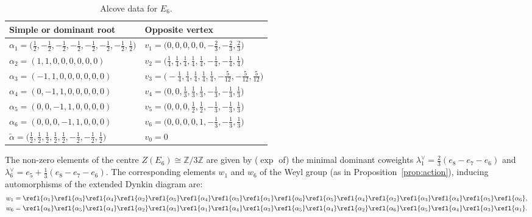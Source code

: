\documentclass[pdftex]{sigma}
\numberwithin{equation}{section}
\begin{document}
\begin{table}[h] \centering\renewcommand{\arraystretch}{1.3}
\caption{Alcove data for $E_6$.}\label{table:alcE6}
\vspace{1mm}

\begin{tabular}{ll}
\hline
Simple or dominant root & Opposite vertex
\\
\hline
$\alpha_1=\big(\frac{1}{2},-\frac{1}{2},-\frac{1}{2},-\frac{1}{2},-\frac{1}{2},-\frac{1}{2},-\frac{1}{2},\frac{1}{2}\big)$ &
$v_1=\big(0,0,0,0,0,-\frac{2}{3},-\frac{2}{3},\frac{2}{3}\big)$
\\
$\alpha_2=(1,1,0,0,0,0,0,0)$ &
$v_2=\big(\frac{1}{4},\frac{1}{4},\frac{1}{4},\frac{1}{4},\frac{1}{4},-\frac{1}{4},-\frac{1}{4},\frac{1}{4}\big)$
\\
$\alpha_3=(-1,1,0,0,0,0,0,0)$ &
$v_3=\big({-}\frac{1}{4},\frac{1}{4},\frac{1}{4},\frac{1}{4},\frac{1}{4},-\frac{5}{12},-\frac{5}{12},\frac{5}{12}\big)$
\\
$\alpha_4=(0,-1,1,0,0,0,0,0)$ & $v_4=\big(0,0,\frac{1}{3},\frac{1}{3},\frac{1}{3},-\frac{1}{3},-\frac{1}{3},\frac{1}{3}\big)$
\\
$\alpha_5=(0,0,-1,1,0,0,0,0)$ & $v_5=\big(0,0,0,\frac{1}{2},\frac{1}{2},-\frac{1}{3},-\frac{1}{3},\frac{1}{3}\big)$
\\
$\alpha_6=(0,0,0,-1,1,0,0,0)$ & $v_6=\big(0,0,0,0,1,-\frac{1}{3},-\frac{1}{3},\frac{1}{3}\big)$
\\
$\tilde{\alpha}=\big(\frac{1}{2},\frac{1}{2},\frac{1}{2},\frac{1}{2},\frac{1}{2},-\frac{1}{2},-\frac{1}{2},\frac{1}{2}\big)$ &
$v_0=0$
\\
\hline
\end{tabular}
\end{table}

The non-zero elements of the centre $Z(E_6) \cong {\mathbb{Z}}/3{\mathbb{Z}}$ are given by ($\exp$ of) the minimal
dominant coweights $\lambda_1^\vee = \frac{2}{3}(e_8-e_7-e_6)$ and $\lambda_6^\vee=e_5+ \frac{1}{3}(e_8-e_7-e_6)$.
The corresponding elements $w_1$ and $w_6$ of the Weyl group (as in Proposition~\ref{prop:action}), inducing
automorphisms of the extended Dynkin diagram are:
\begin{gather*}
w_1=\refl{\alpha_1}\refl{\alpha_3}\refl{\alpha_4}\refl{\alpha_2}\refl{\alpha_5}\refl{\alpha_4}\refl{\alpha_3}\refl{\alpha_1}
    \refl{\alpha_6}\refl{\alpha_5}\refl{\alpha_4}\refl{\alpha_2}\refl{\alpha_3}\refl{\alpha_4}\refl{\alpha_5}\refl{\alpha_6},
\\
w_6=\refl{\alpha_6}\refl{\alpha_5}\refl{\alpha_4}\refl{\alpha_2}\refl{\alpha_3}\refl{\alpha_1}\refl{\alpha_4}\refl{\alpha_3}
    \refl{\alpha_5}\refl{\alpha_4}\refl{\alpha_2}\refl{\alpha_6}\refl{\alpha_5}\refl{\alpha_4}\refl{\alpha_3}\refl{\alpha_1}.
\end{gather*}
\end{document}
